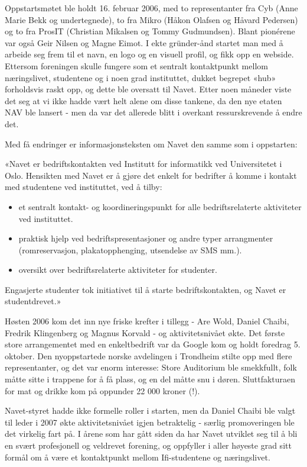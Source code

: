 \documentclass[../main.tex]{subfiles}
\begin{document}
Oppstartsmøtet ble holdt 16. februar 2006, med to representanter fra Cyb (Anne Marie Bekk og undertegnede), to fra Mikro (Håkon Olafsen og Håvard Pedersen) og to fra ProsIT (Christian Mikalsen og Tommy Gudmundsen). Blant pionérene var også Geir Nilsen og Magne Eimot. I ekte gründer-ånd startet man med å arbeide seg frem til et navn, en logo og en visuell profil, og fikk opp en webside. Ettersom foreningen skulle fungere som et sentralt kontaktpunkt mellom næringslivet, studentene og i noen grad instituttet, dukket begrepet «hub» forholdsvis raskt opp, og dette ble oversatt til Navet. Etter noen måneder viste det seg at vi ikke hadde vært helt alene om disse tankene, da den nye etaten NAV ble lansert - men da var det allerede blitt i overkant ressurskrevende å endre det.

Med få endringer er informasjonsteksten om Navet den samme som i oppstarten:

«Navet er bedriftskontakten ved Institutt for informatikk ved Universitetet i Oslo. Hensikten med Navet er å gjøre det enkelt for bedrifter å komme i kontakt med studentene ved instituttet, ved å tilby:

\begin{itemize}
\item et sentralt kontakt- og koordineringspunkt for alle bedriftsrelaterte aktiviteter ved instituttet.
\item praktisk hjelp ved bedriftspresentasjoner og andre typer arrangmenter (romreservasjon, plakatopphenging, utsendelse av SMS mm.).
\item oversikt over bedriftsrelaterte aktiviteter for studenter.  
\end{itemize}

Engasjerte studenter tok initiativet til å starte bedriftskontakten, og Navet er studentdrevet.»

Høsten 2006 kom det inn nye friske krefter i tillegg - Are Wold, Daniel Chaibi, Fredrik Klingenberg og Magnus Korvald - og aktivitetsnivået økte. Det første store arrangementet med en enkeltbedrift var da Google kom og holdt foredrag 5. oktober. Den nyoppstartede norske avdelingen i Trondheim stilte opp med flere representanter, og det var enorm interesse: Store Auditorium ble smekkfullt, folk måtte sitte i trappene for å få plass, og en del måtte snu i døren. Sluttfakturaen for mat og drikke kom på oppunder 22 000 kroner (!).

Navet-styret hadde ikke formelle roller i starten, men da Daniel Chaibi ble valgt til leder i 2007 økte aktivitetsnivået igjen betraktelig - særlig promoveringen ble det virkelig fart på. I årene som har gått siden da har Navet utviklet seg til å bli en svært profesjonell og veldrevet forening, og oppfyller i aller høyeste grad sitt formål om å være et kontaktpunkt mellom Ifi-studentene og næringslivet.
\end{document}
